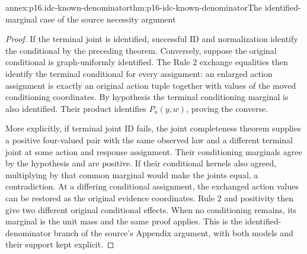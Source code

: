 \begin{annexitem}{annex:p16.idc-known-denominator}{thm:p16-idc-known-denominator}{The identified-marginal case of the source necessity argument}
\begin{proof}
If the terminal joint is identified, successful ID and normalization
identify the conditional by the preceding theorem. Conversely, suppose
the original conditional is graph-uniformly identified. The Rule 2
exchange equalities then identify the terminal conditional for every
assignment: an enlarged action assignment is exactly an original
action tuple together with values of the moved conditioning coordinates.
By hypothesis the terminal conditioning marginal is also identified.
Their product identifies \(P_a(y,w)\), proving the converse.

More explicitly, if terminal joint ID fails, the joint completeness
theorem supplies a positive four-valued pair with the same observed
law and a different terminal joint at some action and response
assignment. Their conditioning marginals agree by the hypothesis
and are positive. If their conditional kernels also agreed, multiplying
by that common marginal would make the joints equal, a contradiction.
At a differing conditional assignment, the exchanged action values
can be restored as the original evidence coordinates. Rule 2 and
positivity then give two different original conditional effects.
When no conditioning remains, its marginal is the unit mass and
the same proof applies. This is the identified-denominator branch
of the source's Appendix argument, with both models and their
support kept explicit.
\end{proof}
\end{annexitem}

